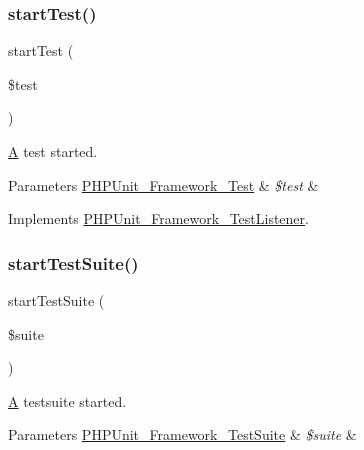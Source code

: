 \subsubsection{\texorpdfstring{start\+Test()}{startTest()}}
{\footnotesize\ttfamily start\+Test (\begin{DoxyParamCaption}\item[{\mbox{\hyperlink{interface_p_h_p_unit___framework___test}{P\+H\+P\+Unit\+\_\+\+Framework\+\_\+\+Test}}}]{\$test }\end{DoxyParamCaption})}

\mbox{\hyperlink{class_a}{A}} test started.


\begin{DoxyParams}[1]{Parameters}
\mbox{\hyperlink{interface_p_h_p_unit___framework___test}{P\+H\+P\+Unit\+\_\+\+Framework\+\_\+\+Test}} & {\em \$test} & \\
\hline
\end{DoxyParams}


Implements \mbox{\hyperlink{interface_p_h_p_unit___framework___test_listener_a1a9bddc54f26bb3fb5c2ec9778ea5198}{P\+H\+P\+Unit\+\_\+\+Framework\+\_\+\+Test\+Listener}}.

\mbox{\label{class_p_h_p_unit___text_u_i___result_printer_a901a86a623d83184267b21f2daee0ff5}} 
\subsubsection{\texorpdfstring{start\+Test\+Suite()}{startTestSuite()}}
{\footnotesize\ttfamily start\+Test\+Suite (\begin{DoxyParamCaption}\item[{\mbox{\hyperlink{class_p_h_p_unit___framework___test_suite}{P\+H\+P\+Unit\+\_\+\+Framework\+\_\+\+Test\+Suite}}}]{\$suite }\end{DoxyParamCaption})}

\mbox{\hyperlink{class_a}{A}} testsuite started.


\begin{DoxyParams}[1]{Parameters}
\mbox{\hyperlink{class_p_h_p_unit___framework___test_suite}{P\+H\+P\+Unit\+\_\+\+Framework\+\_\+\+Test\+Suite}} & {\em \$suite} & \\
\hline
\end{DoxyParams}


